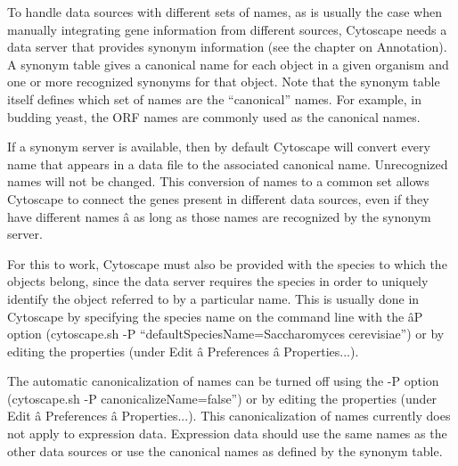  To handle data sources with different sets of names, as is usually the case when manually integrating gene information from different sources, Cytoscape needs a data server that provides synonym information (see the chapter on Annotation). A synonym table gives a canonical name for each object in a given organism and one or more recognized synonyms for that object. Note that the synonym table itself defines which set of names are the ``canonical'' names. For example, in budding yeast, the ORF names are commonly used as the canonical names. 


 If a synonym server is available, then by default Cytoscape will convert every name that appears in a data file to the associated canonical name. Unrecognized names will not be changed. This conversion of names to a common set allows Cytoscape to connect the genes present in different data sources, even if they have different names \^a as long as those names are recognized by the synonym server. 


 For this to work, Cytoscape must also be provided with the species to which the objects belong, since the data server requires the species in order to uniquely identify the object referred to by a particular name. This is usually done in Cytoscape by specifying the species name on the command line with the \^aP option (cytoscape.sh -P ``defaultSpeciesName=Saccharomyces cerevisiae'') or by editing the properties (under Edit \^a Preferences \^a Properties...). 

 The automatic canonicalization of names can be turned off using the -P option (cytoscape.sh -P canonicalizeName=false'') or by editing the properties (under Edit \^a Preferences \^a Properties...). This canonicalization of names currently does not apply to expression data. Expression data should use the same names as the other data sources or use the canonical names as defined by the synonym table. 
